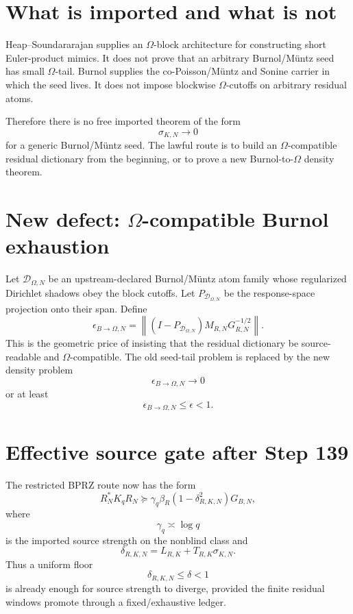 \documentclass[11pt]{article}
\begin{document}
\section{What is imported and what is not}
Heap--Soundararajan supplies an \(\Omega\)-block architecture for constructing short Euler-product mimics.  It does not prove that an arbitrary Burnol/M\"untz seed has small \(\Omega\)-tail.  Burnol supplies the co-Poisson/M\"untz and Sonine carrier in which the seed lives.  It does not impose blockwise \(\Omega\)-cutoffs on arbitrary residual atoms.

Therefore there is no free imported theorem of the form
\[
  \sigma_{K,N}\to0
\]
for a generic Burnol/M\"untz seed.  The lawful route is to build an \(\Omega\)-compatible residual dictionary from the beginning, or to prove a new Burnol-to-\(\Omega\) density theorem.

\section{New defect: \(\Omega\)-compatible Burnol exhaustion}
Let \(\mathcal D_{\Omega,N}\) be an upstream-declared Burnol/M\"untz atom family whose regularized Dirichlet shadows obey the block cutoffs.  Let \(P_{\mathcal D_{\Omega,N}}\) be the response-space projection onto their span.  Define
\[
  \epsilon_{B\to\Omega,N}
  =
  \left\|
  (I-P_{\mathcal D_{\Omega,N}})M_{R,N}G_{R,N}^{-1/2}
  \right\|.
\]
This is the geometric price of insisting that the residual dictionary be source-readable and \(\Omega\)-compatible.  The old seed-tail problem is replaced by the new density problem
\[
  \epsilon_{B\to\Omega,N}\to0
\]
or at least
\[
  \epsilon_{B\to\Omega,N}\le \epsilon<1.
\]

\section{Effective source gate after Step 139}
The restricted BPRZ route now has the form
\[
  R_N^*K_qR_N
  \succeq
  \gamma_q\beta_R(1-\delta_{R,K,N}^2)G_{B,N},
\]
where
\[
  \gamma_q\asymp \log q
\]
is the imported source strength on the nonblind class and
\[
  \delta_{R,K,N}=L_{R,K}+T_{R,K}\sigma_{K,N}.
\]
Thus a uniform floor
\[
  \delta_{R,K,N}\le\delta<1
\]
is already enough for source strength to diverge, provided the finite residual windows promote through a fixed/exhaustive ledger.
\end{document}
